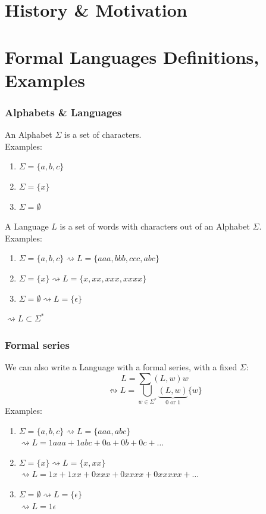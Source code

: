 \documentclass{beamer}
\begin{document}
\frame{\titlepage}

\section{History \& Motivation}
\section{Formal Languages Definitions, Examples}
\begin{frame}
  \frametitle{Alphabets \& Languages}
  An Alphabet $\Sigma$ is a set of characters.\\
  Examples:
  \begin{enumerate}
    \item $\Sigma = \{a,b,c\}$
    \item $\Sigma = \{x\}$
    \item $\Sigma = \emptyset$
  \end{enumerate}
  A Language $L$ is a set of words with characters 
  out of an Alphabet $\Sigma$.\\
  Examples:
  \begin{enumerate}
    \item $\Sigma = \{a,b,c\} \rightsquigarrow L = \{aaa, bbb, ccc, abc\}$
    \item $\Sigma = \{x\} \rightsquigarrow L = \{ x, xx, xxx, xxxx\}$
    \item $\Sigma = \emptyset \rightsquigarrow L = \{\epsilon \}$
  \end{enumerate}
  $\rightsquigarrow L \subset \Sigma^*$
\end{frame}

\begin{frame}
  \frametitle{Formal series}
  We can also write a Language with a formal series, with a fixed $\Sigma$:
    \[ L = \sum (L,w)w\]
    \[ 
      \leftrightsquigarrow  L = 
      \bigcup_{w \in \Sigma^{*}}
      \underbrace{(L,w)}_\text{0 or 1}
      \{w\} 
    \]
  Examples:
  \begin{enumerate}
    \item $\Sigma = \{a,b,c\} \rightsquigarrow L = \{aaa, abc\}$ \\
          $\rightsquigarrow L = 1aaa + 1abc + 0a + 0b + 0c + \dots$
    \item $\Sigma = \{x\} \rightsquigarrow L = \{ x, xx\}$ \\
            $\rightsquigarrow L = 1x + 1xx + 0xxx + 0xxxx +  0xxxxx + \dots$
          \item $\Sigma = \emptyset \rightsquigarrow L = \{ \epsilon \}$ \\
            $\rightsquigarrow L = 1\epsilon$
  \end{enumerate}
\end{frame}
\end{document}
